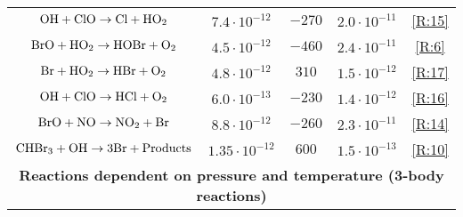 \begin{table}[]
{\begin{tabular}{|c|ccc|c|c|c|l|}
$\mathrm{OH} + \mathrm{ClO} \rightarrow \mathrm{Cl} + \mathrm{HO_2}$         & \multicolumn{1}{c|}{$7.4\cdot10^{-12}$}   & \multicolumn{2}{c|}{$-270$}                                                  & $2.0\cdot10^{-11}$                             & \multicolumn{3}{c|}{\ref{R:15}}                                                                                        \\
$\mathrm{BrO} + \mathrm{HO_2} \rightarrow \mathrm{HOBr} + \mathrm{O_2}$      & \multicolumn{1}{c|}{$4.5\cdot10^{-12}$}   & \multicolumn{2}{c|}{$-460$}                                                  & $2.4\cdot10^{-11}$                             & \multicolumn{3}{c|}{\ref{R:6}}                                                                                         \\
$\mathrm{Br} + \mathrm{HO_2} \rightarrow \mathrm{HBr} + \mathrm{O_2}$        & \multicolumn{1}{c|}{$4.8\cdot10^{-12}$}   & \multicolumn{2}{c|}{$310$}                                                   & $1.5\cdot10^{-12}$                             & \multicolumn{3}{c|}{\ref{R:17}}                                                                                        \\
$\mathrm{OH} + \mathrm{ClO} \rightarrow \mathrm{HCl} + \mathrm{O_2}$         & \multicolumn{1}{c|}{$6.0\cdot10^{-13}$}   & \multicolumn{2}{c|}{$-230$}                                                  & $1.4\cdot10^{-12}$                             & \multicolumn{3}{c|}{\ref{R:16}}                                                                                        \\
$\mathrm{BrO} + \mathrm{NO} \rightarrow \mathrm{NO_2} + \mathrm{Br}$         & \multicolumn{1}{c|}{$8.8\cdot10^{-12}$}   & \multicolumn{2}{c|}{$-260$}                                                  & $2.3\cdot10^{-11}$                             & \multicolumn{3}{c|}{\ref{R:14}}                                                                                        \\
$\mathrm{CHBr_3} + \mathrm{OH} \rightarrow 3\mathrm{Br} + \mathrm{Products}$ & \multicolumn{1}{c|}{$1.35\cdot10^{-12}$}  & \multicolumn{2}{c|}{$600$}                                                   & $1.5\cdot10^{-13}$                             & \multicolumn{3}{c|}{\ref{R:10}}                                                                                        \\ \hline
\multicolumn{8}{|c|}{\textbf{Reactions dependent on pressure and temperature (3-body reactions)}}                                                                                                                                                                                                                                                                         \\ \hline

\end{tabular}}
\end{table}
